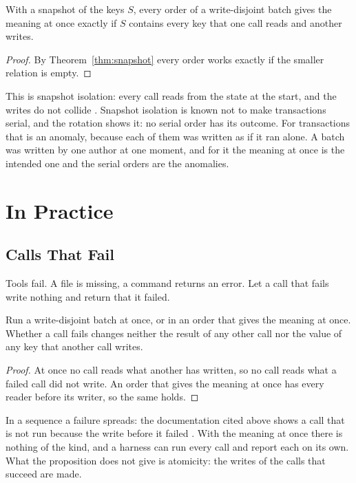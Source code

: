 \documentclass[acmsmall,nonacm,screen]{acmart}
\begin{document}
\begin{proposition}\label{prop:concurrent}
With a snapshot of the keys $S$, every order of a write-disjoint batch gives the meaning at
once exactly if $S$ contains every key that one call reads and another writes.
\end{proposition}

\begin{proof}
By Theorem~\ref{thm:snapshot} every order works exactly if the smaller relation is empty.
\end{proof}

This is snapshot isolation: every call reads from the state at the start, and the writes do
not collide \citep{Berenson1995}. Snapshot isolation is known not to make transactions
serial, and the rotation shows it: no serial order has its outcome. For transactions that
is an anomaly, because each of them was written as if it ran alone. A batch was written by
one author at one moment, and for it the meaning at once is the intended one and the serial
orders are the anomalies.

\section{In Practice}\label{sec:practice}

\subsection{Calls That Fail}

Tools fail. A file is missing, a command returns an error. Let a call that fails write
nothing and return that it failed.

\begin{proposition}[Failures]\label{prop:fail}
Run a write-disjoint batch at once, or in an order that gives the meaning at once. Whether
a call fails changes neither the result of any other call nor the value of any key that
another call writes.
\end{proposition}

\begin{proof}
At once no call reads what another has written, so no call reads what a failed call did not
write. An order that gives the meaning at once has every reader before its writer, so the
same holds.
\end{proof}

In a sequence a failure spreads: the documentation cited above shows a call that is not run
because the write before it failed \citep{claudeparallel}. With the meaning at once there is
nothing of the kind, and a harness can run every call and report each on its own. What the
proposition does not give is atomicity: the writes of the calls that succeed are made.
\end{document}
